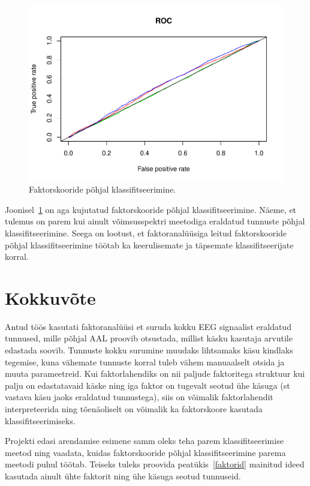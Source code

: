 \documentclass[a4paper,12pt]{report}
\begin{document}
\begin{figure}[h!]
	\centering\includegraphics[width=12cm]{rocfac.pdf}
	\caption{Faktorskooride põhjal klassifitseerimine.}\label{rocfac}
\end{figure}

Joonisel~\ref{rocfac} on aga kujutatud faktorskooride põhjal klassifitseerimine. Näeme, et tulemus on parem kui ainult võimsusspektri meetodiga eraldatud tunnuste põhjal klassifitseerimine. Seega on lootust, et faktoranalüüsiga leitud faktorskooride põhjal klassifitseerimine töötab ka keerulisemate ja täpsemate klassifitseerijate korral.

\chapter{Kokkuvõte}

Antud töös kasutati faktoranalüüsi et suruda kokku EEG signaalist eraldatud tunnused, mille põhjal AAL proovib otsustada, millist käsku kasutaja arvutile edastada soovib. Tunnuste kokku surumine muudaks lihtsamaks käsu kindlaks tegemise, kuna vähemate tunnuste korral tuleb vähem manuaalselt otsida ja muuta parameetreid. Kui faktorlahendiks on nii paljude faktoritega struktuur kui palju on edastatavaid käske ning iga faktor on tugevalt seotud ühe käsuga (st vastava käsu jaoks eraldatud tunnustega), siis on võimalik faktorlahendit interpreteerida ning tõenäoliselt on võimalik ka faktorskoore kasutada klassifitseerimiseks.

Projekti edasi arendamise esimene samm oleks teha parem klassifitseerimise meetod ning vaadata, kuidas faktorskooride põhjal klassifitseerimine parema meetodi puhul töötab. Teiseks tuleks proovida peatükis~\ref{faktorid} mainitud ideed kasutada ainult ühte faktorit ning ühe käsuga seotud tunnuseid.
\end{document}
